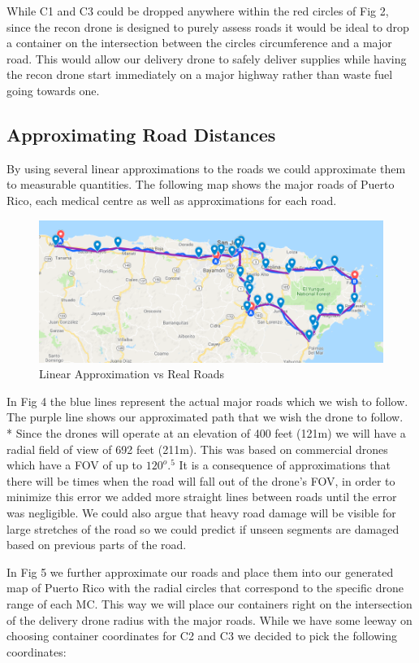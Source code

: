 \documentclass[a4paper,12pt]{article}
\begin{document}
While C1 and C3 could be dropped anywhere within the red circles of Fig 2, since the recon drone is designed to purely assess roads it would be ideal to drop a container on the intersection between the circles circumference and a major road.
This would allow our delivery drone to safely deliver supplies while having the recon drone start immediately on a major highway rather than waste fuel going towards one.
\subsection{Approximating Road Distances}
By using several linear approximations to the roads we could approximate them to measurable quantities. The following map shows the major roads of Puerto Rico, each medical centre as well as approximations for each road.

\begin{figure}[h]
\centering
\includegraphics[scale =0.5]{ConnectedLineMap}
\caption{Linear Approximation vs Real Roads}
\label{road-approx}
\end{figure}

\newpage
In Fig 4 the blue lines represent the actual major roads which we wish to follow. The purple line shows our approximated path that we wish the drone to follow.\\*
Since the drones will operate at an elevation of 400 feet (121m) we will have a radial field of view of 692 feet (211m). This was based on commercial drones which have a FOV of up to $120^{o}$$.^{5}$
It is a consequence of approximations that there will be times when the road will fall out of the drone's FOV, in order to minimize this error we added more straight lines between roads until the error was negligible.
We could also argue that heavy road damage will be visible for large stretches of the road so we could predict if unseen segments are damaged based on previous parts of the road.

In Fig 5 we further approximate our roads and place them into our generated map of Puerto Rico with the radial circles that correspond to the specific drone range of each MC.
This way we will place our containers right on the intersection of the delivery drone radius with the major roads.  While we have some leeway on choosing container coordinates for C2 and C3 we decided to pick the following coordinates:
\end{document}

